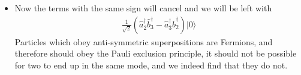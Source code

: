 \documentclass[english]{article}
\newcommand{\ket}[1]{|#1 \rangle}
\begin{document}
\begin{enumerate}
\begin{itemize}
\begin{align}
\frac{1}{2}(i\hat{a}^{\dagger}_2+\hat{a}^{\dagger}_3)(i\hat{b}^{\dagger}_3+\hat{b}^{\dagger}_2)\ket{0}=\\
\frac{1}{2}(i\hat{a}^{\dagger}_2\hat{b}^{\dagger}_2+\hat{a}^{\dagger}_3\hat{b}^{\dagger}_2-\hat{a}^{\dagger}_2\hat{b}^{\dagger}_3+i\hat{a}^{\dagger}_3\hat{b}^{\dagger}_3)\ket{0}
\end{align}
If we sum this with the result from before we notice the cross terms have opposite signs, leaving 
\begin{align}
\frac{i}{\sqrt{2}}(\hat{a}^{\dagger}_2\hat{b}^{\dagger}_2+\hat{a}^{\dagger}_3\hat{b}^{\dagger}_3)\ket{0}
\end{align}
which is consistant with Hong-Ou-Mandel. Physically this makes sense because photons are Bosons, and therefore should exist in symmetric superpositions, even if we label them as long as we respect the symmetry we should recover the result.
\item Now the terms with the same sign will cancel and we will be left with 
\begin{align}
\frac{1}{\sqrt{2}}(\hat{a}^{\dagger}_2\hat{b}^{\dagger}_3-\hat{a}^{\dagger}_3\hat{b}^{\dagger}_2)\ket{0}
\end{align}
Particles which obey anti-symmetric superpositions are Fermions, and therefore should obey the Pauli exclusion principle, it should not be possible for two to end up in the same mode, and we indeed find that they do not.
\end{itemize}



\end{enumerate}
\end{document}
